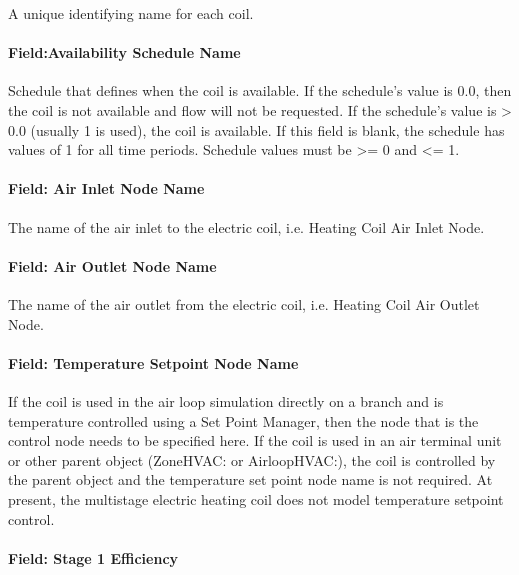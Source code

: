 A unique identifying name for each coil.

\paragraph{Field:Availability Schedule Name}\label{fieldavailability-schedule-name-4}

Schedule that defines when the coil is available. If the schedule's value is 0.0, then the coil is not available and flow will not be requested. If the schedule's value is \textgreater{} 0.0 (usually 1 is used), the coil is available. If this field is blank, the schedule has values of 1 for all time periods. Schedule values must be \textgreater{}= 0 and \textless{}= 1.

\paragraph{Field: Air Inlet Node Name}\label{field-air-inlet-node-name-4-001}

The name of the air inlet to the electric coil, i.e. Heating Coil Air Inlet Node.

\paragraph{Field: Air Outlet Node Name}\label{field-air-outlet-node-name-4-001}

The name of the air outlet from the electric coil, i.e. Heating Coil Air Outlet Node.

\paragraph{Field: Temperature Setpoint Node Name}\label{field-temperature-setpoint-node-name-2}

If the coil is used in the air loop simulation directly on a branch and is temperature controlled using a Set Point Manager, then the node that is the control node needs to be specified here. If the coil is used in an air terminal unit or other parent object (ZoneHVAC: or AirloopHVAC:), the coil is controlled by the parent object and the temperature set point node name is not required. At present, the multistage electric heating coil does not model temperature setpoint control.

\paragraph{Field: Stage 1 Efficiency}\label{field-stage-1-efficiency}


